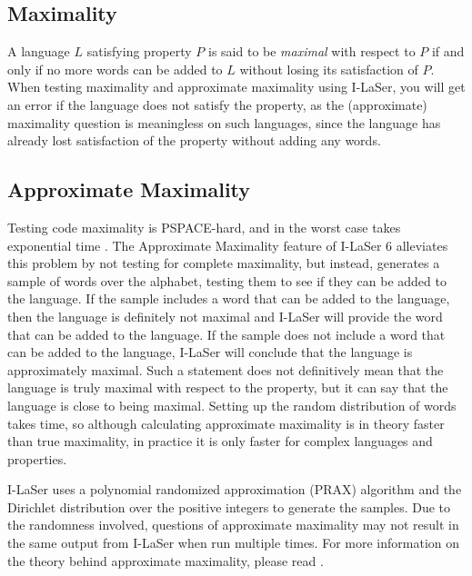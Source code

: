 \documentclass{article}
\begin{document}
\subsection{Maximality}
\par A language $L$ satisfying property $P$ is said to be \textit{maximal} with respect to $P$ if and only if no more words can be added to $L$ without losing its satisfaction of $P$. When testing maximality and approximate maximality using I-LaSer, you will get an error if the language does not satisfy the property, as the (approximate) maximality question is meaningless on such languages, since the language has already lost satisfaction of the property without adding any words. 

\subsection{Approximate Maximality}
\par Testing code maximality is PSPACE-hard, and in the worst case takes exponential time \cite{Approx}.
The Approximate Maximality feature of I-LaSer 6 alleviates this problem by not testing for complete maximality, but instead, generates a sample of words over the alphabet, testing them to see if they can be added to the language.
If the sample includes a word that can be added to the language, then the language is definitely not maximal and I-LaSer will provide the word that can be added to the language.
If the sample does not include a word that can be added to the language, I-LaSer will conclude that the language is approximately maximal.
Such a statement does not definitively mean that the language is truly maximal with respect to the property, but it can say that the language is close to being maximal.
Setting up the random distribution of words takes time, so although calculating approximate maximality is in theory faster than true maximality, in practice it is only faster for complex languages and properties. 

\par I-LaSer uses a polynomial randomized approximation (PRAX) algorithm and the Dirichlet distribution over the positive integers to generate the samples. Due to the randomness involved, questions of approximate maximality may not result in the same output from I-LaSer when run multiple times. For more information on the theory behind approximate maximality, please read \cite{Approx}.

\end{document}
